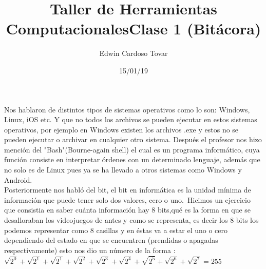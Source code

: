 \documentclass[letterpaper, 12pt, oneside]{article}%
\title{\Huge Taller de Herramientas Computacionales}
\author{Edwin Cardoso Tovar}%
\date{15/01/19}%
\begin{document}
	\maketitle
	\begin{center}%
	\end{center}%
	\newpage%
	
	\title{\Huge Clase 1 (Bitácora)  \\}%
	
Nos hablaron de distintos tipos de sistemas operativos como lo son: Windows, Linux, iOS etc. Y que no todos los archivos se pueden ejecutar en estos sistemas operativos, por ejemplo en Windows existen los archivos .exe y estos no se pueden ejecutar o archivar en cualquier otro sistema. Después el profesor nos hizo mención del "Bash"(Bourne-again shell) el cual es un programa informático, cuya función consiste en interpretar órdenes con un determinado lenguaje, además que no solo es de Linux pues ya se ha llevado a otros sistemas como Windows y Android.\\

Posteriormente nos habló del bit, el bit en informática es la unidad mínima de información que puede tener solo dos valores, cero o uno.\
Hicimos un ejercicio que consistia en saber cuánta información hay 8 bits,qué es la forma en que se desalloraban los videojuegos de antes y como se representa, es decir los 8 bits los podemos representar como 8 casillas y en éstas va a estar el uno o cero dependiendo del estado en que se encuentren (prendidas o apagadas respectivamente) esto nos dio un número de la forma : $\sqrt{2^0} + \sqrt{2^1} + \sqrt{2^1} + \sqrt{2^2} + \sqrt{2^3} + \sqrt{2^4} + \sqrt{2^5} + \sqrt{2^6} + \sqrt{2^7}= 255$






	
\end{document}
